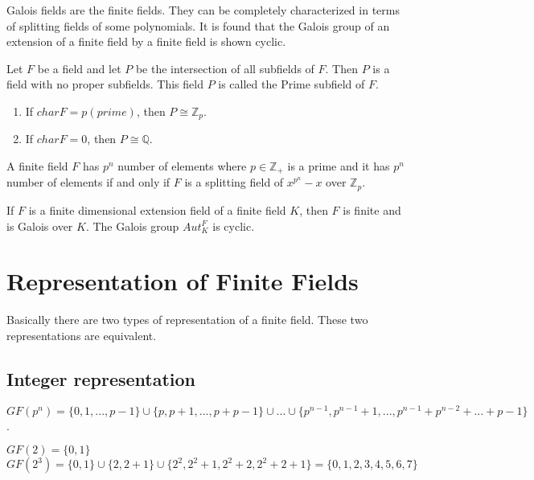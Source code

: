 Galois fields are the finite fields. They can be completely characterized in terms of splitting fields of some polynomials. It is found that the Galois group of an extension of a finite field by a finite field is shown cyclic.\\

\begin{definition}
Let \(F\) be a field and let \(P\) be the intersection of all subfields of \(F\). Then \(P\) is a field with no proper subfields. This field \(P\) is called the Prime subfield of \(F\).
\end{definition}

\begin{enumerate}
\item If \(charF=p(prime)\), then \(P\cong {\mathbb{Z}}_p\).
\item If \(charF=0\), then \(P\cong \mathbb{Q}\).
\end{enumerate}

\begin{theorem}
A  finite field \(F\) has \(p^n\) number of elements where \(p \in \mathbb{Z}_+\) is a prime and it has \(p^n\) number of elements if and only if \(F\) is a splitting field of \(x^{p^n} - x\) over \(\mathbb{Z}_p\).\\
\end{theorem}

\begin{theorem}
  If \(F\) is a finite dimensional extension field of a finite field \(K\), then \(F\) is finite and is Galois over \(K\). The Galois group \(Aut_K^F\) is cyclic.
\end{theorem}

\section{Representation of Finite Fields}
Basically there are two types of representation of a finite field. These two representations are equivalent. 
\subsection{Integer representation}

\(GF(p^n)=\{0,1,...,p-1\} \cup \{p,p+1,...,p+p-1\} \cup ... \cup \{p^{n-1},p^{n-1}+1,...,p^{n-1}+p^{n-2}+...+p-1\}\).

\begin{example}
    \(GF(2)=\{0,1\}\)\\
    \(GF(2^3)=\{0,1\} \cup \{2,2+1\} \cup \{2^2,2^2+1,2^2+2,2^2+2+1\}=\{0,1,2,3,4,5,6,7\}\)
\end{example}

